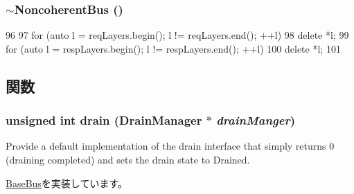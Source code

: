 \hypertarget{classNoncoherentBus_a80310b44cba4493123399310722fd6e6}{
\subsubsection[{$\sim$NoncoherentBus}]{\setlength{\rightskip}{0pt plus 5cm}$\sim${\bf NoncoherentBus} ()}}
\label{classNoncoherentBus_a80310b44cba4493123399310722fd6e6}



\begin{DoxyCode}
96 {
97     for (auto l = reqLayers.begin(); l != reqLayers.end(); ++l)
98         delete *l;
99     for (auto l = respLayers.begin(); l != respLayers.end(); ++l)
100         delete *l;
101 }
\end{DoxyCode}


\subsection{関数}
\hypertarget{classNoncoherentBus_aa8a18d230dba7a674ac8a0b4f35bc36a}{
\subsubsection[{drain}]{\setlength{\rightskip}{0pt plus 5cm}unsigned int drain ({\bf DrainManager} $\ast$ {\em drainManger})}}
\label{classNoncoherentBus_aa8a18d230dba7a674ac8a0b4f35bc36a}
Provide a default implementation of the drain interface that simply returns 0 (draining completed) and sets the drain state to Drained. 

\hyperlink{classBaseBus_ac8c1510f7e1591e75a5c79b4b873f6b4}{BaseBus}を実装しています。


